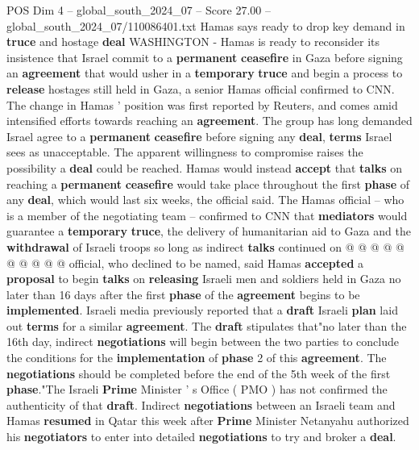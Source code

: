 \begin{textsample}{POS Dim 4 – global\_south\_2024\_07 – Score 27.00 – global\_south\_2024\_07/110086401.txt}  \label{ex:f4_pos_112}
Hamas says ready to drop key demand in \textbf{truce} and hostage \textbf{deal} WASHINGTON - Hamas is ready to reconsider its insistence that Israel commit to a \textbf{permanent} \textbf{ceasefire} in Gaza before signing an \textbf{agreement} that would usher in a \textbf{temporary} \textbf{truce} and begin a process to \textbf{release} hostages still held in Gaza, a senior Hamas official confirmed to CNN.
The change in Hamas ' position was first reported by Reuters, and comes amid intensified efforts towards reaching an \textbf{agreement}.
The group has long demanded Israel agree to a \textbf{permanent} \textbf{ceasefire} before signing any \textbf{deal}, \textbf{terms} Israel sees as unacceptable.
The apparent willingness to compromise raises the possibility a \textbf{deal} could be reached.
Hamas would instead \textbf{accept} that \textbf{talks} on reaching a \textbf{permanent} \textbf{ceasefire} would take place throughout the first \textbf{phase} of any \textbf{deal}, which would last six weeks, the official said.
The Hamas official -- who is a member of the negotiating team -- confirmed to CNN that \textbf{mediators} would guarantee a \textbf{temporary} \textbf{truce}, the delivery of humanitarian aid to Gaza and the \textbf{withdrawal} of Israeli troops so long as indirect \textbf{talks} continued on @ @ @ @ @ @ @ @ @ @ official, who declined to be named, said Hamas \textbf{accepted} a \textbf{proposal} to begin \textbf{talks} on \textbf{releasing} Israeli men and soldiers held in Gaza no later than 16 days after the first \textbf{phase} of the \textbf{agreement} begins to be \textbf{implemented}.
Israeli media previously reported that a \textbf{draft} Israeli \textbf{plan} laid out \textbf{terms} for a similar \textbf{agreement}.
The \textbf{draft} stipulates that"no later than the 16th day, indirect \textbf{negotiations} will begin between the two parties to conclude the conditions for the \textbf{implementation} of \textbf{phase} 2 of this \textbf{agreement}.
The \textbf{negotiations} should be completed before the end of the 5th week of the first \textbf{phase}."The Israeli \textbf{Prime} Minister ' s Office ( PMO ) has not confirmed the authenticity of that \textbf{draft}.
Indirect \textbf{negotiations} between an Israeli team and Hamas \textbf{resumed} in Qatar this week after \textbf{Prime} Minister Netanyahu authorized his \textbf{negotiators} to enter into detailed \textbf{negotiations} to try and broker a \textbf{deal}.

\end{textsample}
